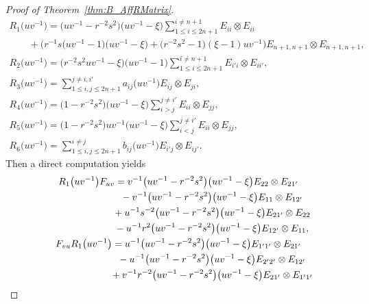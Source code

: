\documentclass[10pt,a4paper]{amsart}
\numberwithin{equation}{section}
\begin{document}
\begin{proof}[Proof of Theorem~\ref{thm:B_AffRMatrix}]
\begin{gather*}
 R_{1}\bigl(uv^{-1}\bigr) = \bigl(uv^{-1} - r^{-2}s^{2}\bigr)\bigl(uv^{-1} - \xi\bigr) \sum_{1 \le i \le 2n + 1}^{i \neq n + 1} E_{ii} \otimes E_{ii} \\
 \qquad{}
 + \bigl(r^{-1}s\bigl(uv^{-1} - 1\bigr)\bigl(uv^{-1} - \xi\bigr) + \bigl(r^{-2}s^{2} - 1\bigr)(\xi - 1)uv^{-1}\bigr)E_{n+1,n + 1} \otimes E_{n+ 1,n + 1}, \\
 R_{2}\bigl(uv^{-1}\bigr) = \bigl(r^{-2}s^{2}uv^{-1} - \xi\bigr)\bigl(uv^{-1} - 1\bigr)\sum_{1 \le i \le 2n + 1}^{i \neq n + 1}E_{i'i} \otimes E_{ii'}, \\
 R_{3}\bigl(uv^{-1}\bigr) = \sum_{1 \le i,j \le 2n + 1}^{j \neq i,i'}a_{ij}\bigl(uv^{-1}\bigr)E_{ij} \otimes E_{ji}, \\
 R_{4}\bigl(uv^{-1}\bigr) = \bigl(1 - r^{-2}s^{2}\bigr)\bigl(uv^{-1} - \xi\bigr)\sum_{i > j}^{j \neq i'}E_{ii} \otimes E_{jj}, \\
 R_{5}\bigl(uv^{-1}\bigr) = \bigl(1 - r^{-2}s^{2}\bigr)uv^{-1}\bigl(uv^{-1} - \xi\bigr)\sum_{i < j}^{j \neq i'}E_{ii} \otimes E_{jj}, \\
 R_{6}\bigl(uv^{-1}\bigr) = \sum_{1 \le i,j \le 2n + 1}^{i \neq j}b_{ij}\bigl(uv^{-1}\bigr)E_{i'j} \otimes E_{ij'}.
\end{gather*}
Then a direct computation yields
\begin{gather*}
 R_{1}\bigl(uv^{-1}\bigr)F_{uv}= v^{-1}\bigl(uv^{-1} - r^{-2}s^{2}\bigr)\bigl(uv^{-1} - \xi\bigr)E_{22} \otimes E_{21'} \\
\hphantom{ R_{1}\bigl(uv^{-1}\bigr)F_{uv}=}{}
- v^{-1}\bigl(uv^{-1} - r^{-2}s^{2}\bigr)\bigl(uv^{-1} - \xi\bigr)E_{11} \otimes E_{12'} \\
\hphantom{ R_{1}\bigl(uv^{-1}\bigr)F_{uv}=}{}
 +u^{-1}s^{-2}\bigl(uv^{-1} - r^{-2}s^{2}\bigr)\bigl(uv^{-1} - \xi\bigr)E_{21'} \otimes E_{22} \\
\hphantom{ R_{1}\bigl(uv^{-1}\bigr)F_{uv}=}{}
 - u^{-1}r^{2}\bigl(uv^{-1} - r^{-2}s^{2}\bigr)\bigl(uv^{-1} - \xi\bigr)E_{12'} \otimes E_{11},
\\
 F_{vu}R_{1}\bigl(uv^{-1}\bigr) = u^{-1}\bigl(uv^{-1} - r^{-2}s^{2}\bigr)\bigl(uv^{-1} - \xi\bigr)E_{1'1'} \otimes E_{21'}\\
 \hphantom{F_{vu}R_{1}\bigl(uv^{-1}\bigr) =}{}
 - u^{-1}\bigl(uv^{-1} - r^{-2}s^{2}\bigr)\bigl(uv^{-1} - \xi\bigr)E_{2'2'} \otimes E_{12'} \\
 \hphantom{F_{vu}R_{1}\bigl(uv^{-1}\bigr) =}{}
 +v^{-1}r^{-2}\bigl(uv^{-1} - r^{-2}s^{2}\bigr)\bigl(uv^{-1} - \xi\bigr)E_{21'} \otimes E_{1'1'} \\

\end{gather*}
\end{proof}
\end{document}
